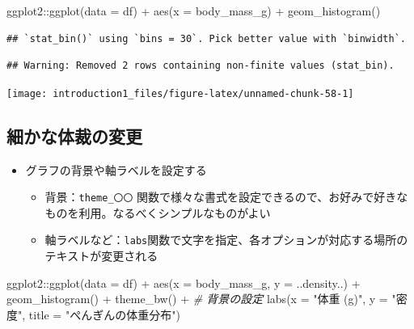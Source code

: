 \documentclass[
]{ltjsarticle}
\newenvironment{Shaded}{\begin{snugshade}}{\end{snugshade}}
\newcommand{\AttributeTok}[1]{\textcolor[rgb]{0.77,0.63,0.00}{#1}}
\newcommand{\CommentTok}[1]{\textcolor[rgb]{0.56,0.35,0.01}{\textit{#1}}}
\newcommand{\FunctionTok}[1]{\textcolor[rgb]{0.00,0.00,0.00}{#1}}
\newcommand{\NormalTok}[1]{#1}
\newcommand{\SpecialCharTok}[1]{\textcolor[rgb]{0.00,0.00,0.00}{#1}}
\newcommand{\StringTok}[1]{\textcolor[rgb]{0.31,0.60,0.02}{#1}}
\providecommand{\tightlist}{%
  \setlength{\itemsep}{0pt}\setlength{\parskip}{0pt}}
\begin{document}
\begin{Shaded}
\begin{Highlighting}[]
\NormalTok{ggplot2}\SpecialCharTok{::}\FunctionTok{ggplot}\NormalTok{(}\AttributeTok{data =}\NormalTok{ df) }\SpecialCharTok{+}
  \FunctionTok{aes}\NormalTok{(}\AttributeTok{x =}\NormalTok{ body\_mass\_g) }\SpecialCharTok{+}
  \FunctionTok{geom\_histogram}\NormalTok{()}
\end{Highlighting}
\end{Shaded}

\begin{verbatim}
## `stat_bin()` using `bins = 30`. Pick better value with `binwidth`.
\end{verbatim}

\begin{verbatim}
## Warning: Removed 2 rows containing non-finite values (stat_bin).
\end{verbatim}

\begin{center}\texttt{[image: introduction1\_files/figure-latex/unnamed-chunk-58-1]} \end{center}

\hypertarget{ux7d30ux304bux306aux4f53ux88c1ux306eux5909ux66f4}{%
\subsection{細かな体裁の変更}\label{ux7d30ux304bux306aux4f53ux88c1ux306eux5909ux66f4}}

\begin{itemize}
\tightlist
\item
  グラフの背景や軸ラベルを設定する

  \begin{itemize}
  \tightlist
  \item
    背景：\texttt{theme\_〇〇}
    関数で様々な書式を設定できるので、お好みで好きなものを利用。なるべくシンプルなものがよい
  \item
    軸ラベルなど：\texttt{labs}関数で文字を指定、各オプションが対応する場所のテキストが変更される
  \end{itemize}
\end{itemize}

\begin{Shaded}
\begin{Highlighting}[]
\NormalTok{ggplot2}\SpecialCharTok{::}\FunctionTok{ggplot}\NormalTok{(}\AttributeTok{data =}\NormalTok{ df) }\SpecialCharTok{+}
  \FunctionTok{aes}\NormalTok{(}\AttributeTok{x =}\NormalTok{ body\_mass\_g, }\AttributeTok{y =}\NormalTok{ ..density..) }\SpecialCharTok{+}
  \FunctionTok{geom\_histogram}\NormalTok{() }\SpecialCharTok{+}
  \FunctionTok{theme\_bw}\NormalTok{() }\SpecialCharTok{+} \CommentTok{\# 背景の設定}
  \FunctionTok{labs}\NormalTok{(}\AttributeTok{x =} \StringTok{"体重 (g)"}\NormalTok{, }\AttributeTok{y =} \StringTok{"密度"}\NormalTok{, }\AttributeTok{title =} \StringTok{"ぺんぎんの体重分布"}\NormalTok{)}
\end{Highlighting}
\end{Shaded}
\end{document}
